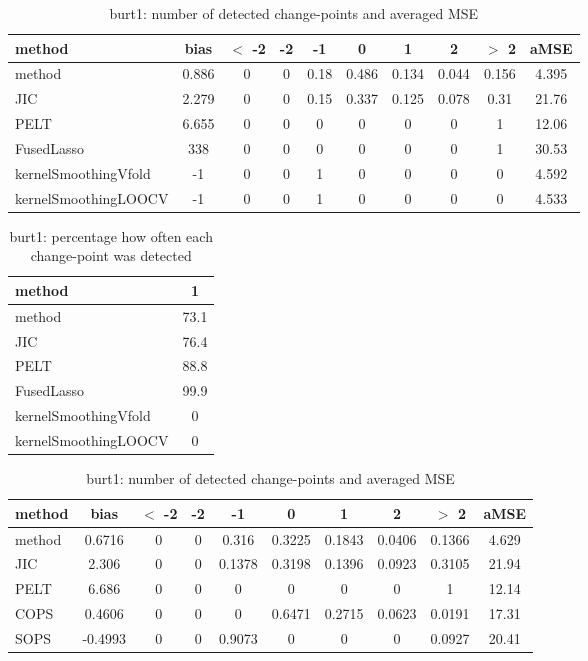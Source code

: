 \begin{table}[ht]
\centering
\begin{tabular}{l|c|ccccccc|c}
  \hline
method & bias & $<$ -2 & -2 & -1 & 0 & 1 & 2 & $>$ 2 & aMSE \\ 
  \hline
method & 0.886 &     0 &     0 &  0.18 & 0.486 & 0.134 & 0.044 & 0.156 & 4.395 \\ 
  JIC & 2.279 &     0 &     0 &  0.15 & 0.337 & 0.125 & 0.078 &  0.31 & 21.76 \\ 
  PELT & 6.655 &     0 &     0 &     0 &     0 &     0 &     0 &     1 & 12.06 \\ 
  FusedLasso &   338 &     0 &     0 &     0 &     0 &     0 &     0 &     1 & 30.53 \\ 
  kernelSmoothingVfold &    -1 &     0 &     0 &     1 &     0 &     0 &     0 &     0 & 4.592 \\ 
  kernelSmoothingLOOCV &    -1 &     0 &     0 &     1 &     0 &     0 &     0 &     0 & 4.533 \\ 
   \hline
\end{tabular}
\caption{burt1: number of detected change-points and averaged MSE} 
\label{tab:burt1Njumps}
\end{table}
\begin{table}[ht]
\centering
\begin{tabular}{l|c}
  \hline
method & 1 \\ 
  \hline
method &   73.1 \\ 
  JIC &   76.4 \\ 
  PELT &   88.8 \\ 
  FusedLasso &   99.9 \\ 
  kernelSmoothingVfold &      0 \\ 
  kernelSmoothingLOOCV &      0 \\ 
   \hline
\end{tabular}
\caption{burt1: percentage how often each change-point was detected} 
\label{tab:burt1Detections}
\end{table}
\begin{table}[ht]
\centering
\begin{tabular}{l|c|ccccccc|c}
  \hline
method & bias & $<$ -2 & -2 & -1 & 0 & 1 & 2 & $>$ 2 & aMSE \\ 
  \hline
method & 0.6716 &     0 &     0 & 0.316 & 0.3225 & 0.1843 & 0.0406 & 0.1366 & 4.629 \\ 
  JIC & 2.306 &     0 &     0 & 0.1378 & 0.3198 & 0.1396 & 0.0923 & 0.3105 & 21.94 \\ 
  PELT & 6.686 &     0 &     0 &     0 &     0 &     0 &     0 &     1 & 12.14 \\ 
  COPS & 0.4606 &     0 &     0 &     0 & 0.6471 & 0.2715 & 0.0623 & 0.0191 & 17.31 \\ 
  SOPS & -0.4993 &     0 &     0 & 0.9073 &     0 &     0 &     0 & 0.0927 & 20.41 \\ 
   \hline
\end{tabular}
\caption{burt1: number of detected change-points and averaged MSE} 
\label{tab:burt1Njumps}
\end{table}

